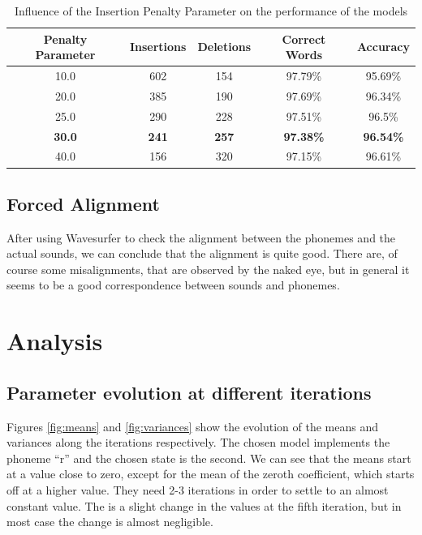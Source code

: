 \documentclass[12pt,a4paper,oneside]{article}
\begin{document}
\begin{table}
\caption{Influence of the Insertion Penalty Parameter on the performance of the models} \label{tab:penalty}
    \begin{tabular}{|c|c|c|c|c|}
    \hline 
    Penalty Parameter & Insertions   & Deletions    & Correct Words & Accuracy \\ \hline \hline
    10.0              & 602          & 154          & 97.79\%          & 95.69\%  		  \\ \hline
    20.0              & 385          & 190          & 97.69\%          & 96.34\%  		  \\ \hline
    25.0              & 290          & 228          & 97.51\%          & 96.5\%   		  \\ \hline
    \textbf{30.0}     & \textbf{241} & \textbf{257} & \textbf{97.38\%} & \textbf{96.54\%}  \\ \hline
    40.0              & 156          & 320          & 97.15\%          & 96.61\%  		  \\ \hline
    \end{tabular}
\end{table}

\subsection{Forced Alignment}
After using Wavesurfer to check the alignment between the phonemes and the actual sounds, we can conclude that the alignment is quite good. There are, of course some misalignments, that are observed by the naked eye, but in general it seems to be a good correspondence between sounds and phonemes.

\section{Analysis}

\subsection{Parameter evolution at different iterations}
Figures \ref{fig:means} and \ref{fig:variances} show the evolution of the means and variances along the iterations respectively. The chosen model implements the phoneme ``r'' and the chosen state is the second. We can see that the means start at a value close to zero, except for the mean of the zeroth coefficient, which starts off at a higher value. They need 2-3 iterations in order to settle to an almost constant value. The is a slight change in the values at the fifth iteration, but in most case the change is almost negligible.
\end{document}
